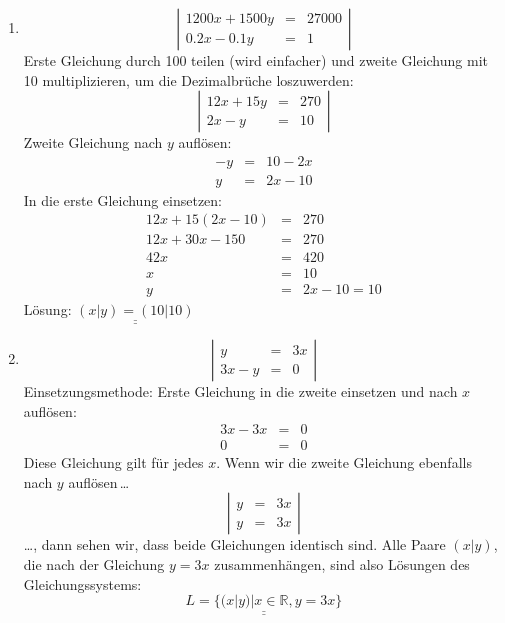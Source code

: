 \documentclass[%
11pt,%
twoside,%
titlepage,%
german,%
]{scrartcl}
\newcommand{\result}[1]{\underline{\underline{#1}}}
\begin{document}
\begin{enumerate}
\begin{enumerate}
  \item 
    \begin{displaymath}
      \left| 
        \begin{array}{rcl}
         1200x + 1500y & = & 27000 \\
         0.2x-0.1y & = & 1
        \end{array} \right|
    \end{displaymath}
Erste Gleichung durch 100 teilen (wird einfacher) und zweite Gleichung mit 10 multiplizieren, um die Dezimalbr\"uche loszuwerden:
    \begin{displaymath}
      \left| 
        \begin{array}{rcl}
         12x + 15y & = & 270 \\
         2x-y & = & 10
        \end{array} \right|
    \end{displaymath}
Zweite Gleichung nach $y$ aufl\"osen:
\begin{eqnarray*}
-y & = & 10-2x \\
y & = & 2x-10
\end{eqnarray*}
In die erste Gleichung einsetzen:
\begin{eqnarray*}
12x+15(2x-10) & = & 270 \\
12x+30x-150 & = & 270 \\
42x & = & 420 \\
x & = & 10 \\
y & = & 2x-10=10
\end{eqnarray*}
    L\"osung: $\result{(x|y)=(10|10)}$

  \item 
    \begin{displaymath}
      \left| 
        \begin{array}{rcl}
         y & = & 3x \\
         3x-y & = & 0
        \end{array} \right|
    \end{displaymath}
    Einsetzungsmethode: Erste Gleichung in die zweite einsetzen und nach $x$ aufl\"osen:
    \begin{eqnarray*}
      3x-3x & = & 0 \\
      0 & = & 0
    \end{eqnarray*}
    Diese Gleichung gilt f\"ur jedes $x$. Wenn wir die zweite Gleichung ebenfalls nach $y$ aufl\"osen\,\ldots
    \begin{displaymath}
      \left| 
        \begin{array}{rcl}
         y & = & 3x \\
         y & = & 3x
        \end{array} \right|
    \end{displaymath}
    \ldots, dann sehen wir, dass beide Gleichungen identisch sind. Alle Paare $(x|y)$, die nach der Gleichung $y=3x$ zusammenh\"angen, sind also L\"osungen des Gleichungssystems:
    \begin{displaymath}
      \result{L = \{(x|y)|x\in\mathbb{R}, y=3x\}}
    \end{displaymath}


\end{enumerate}
\end{enumerate}
\end{document}

